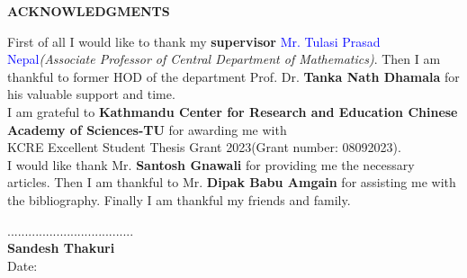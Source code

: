 
\begin{center}
{\Large{\bfseries ACKNOWLEDGMENTS}}
\end{center}

\vspace{1cm}
First of all I would like to thank my \textbf{supervisor} \textcolor{blue}{Mr. Tulasi Prasad Nepal}\textit{(Associate Professor of Central Department of Mathematics)}. Then I am thankful to former HOD of the department Prof. Dr. \textbf{Tanka Nath Dhamala} for his valuable support and time.\\

I am grateful to \textbf{Kathmandu Center for Research and Education Chinese Academy of Sciences-TU} for awarding me with \\
\textcolor{red!90!black}{KCRE Excellent Student Thesis Grant 2023(Grant number: 08092023).}\\

I would like thank  Mr. \textbf{Santosh Gnawali} for providing me the necessary articles. Then I am thankful to Mr. \textbf{Dipak Babu Amgain} for assisting me with the bibliography. Finally I am thankful my friends and family.
\\[5cm]

\begin{minipage}{1\textwidth}
	\begin{flushright}
		....................................\\
		{\bfseries Sandesh Thakuri}\\
		Date: \thedate
	\end{flushright}
\end{minipage}

\clearpage